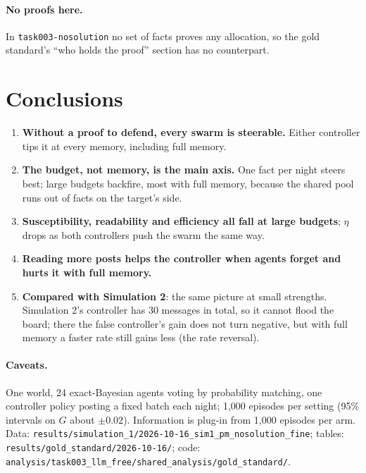 \documentclass[10pt,a4paper]{article}
\begin{document}
\paragraph{No proofs here.} In \texttt{task003-nosolution} no set of facts proves any allocation, so the
gold standard's ``who holds the proof'' section has no counterpart.

\section{Conclusions}

\begin{enumerate}\itemsep2pt
\item \textbf{Without a proof to defend, every swarm is steerable.} Either controller tips it at every memory,
  including full memory.
\item \textbf{The budget, not memory, is the main axis.} One fact per night steers best; large budgets backfire,
  most with full memory, because the shared pool runs out of facts on the target's side.
\item \textbf{Susceptibility, readability and efficiency all fall at large budgets}; $\eta$ drops as both controllers
  push the swarm the same way.
\item \textbf{Reading more posts helps the controller when agents forget and hurts it with full memory.}
\item \textbf{Compared with Simulation 2}: the same picture at small strengths. Simulation 2's controller has
  30 messages in total, so it cannot flood the board; there the false controller's gain does not turn negative, but
  with full memory a faster rate still gains less (the rate reversal).
\end{enumerate}

\paragraph{Caveats.} One world, 24 exact-Bayesian agents voting by probability matching, one controller policy
posting a fixed batch each night; 1{,}000 episodes per setting (95\% intervals on $G$ about $\pm0.02$). Information
is plug-in from 1{,}000 episodes per arm. Data: \texttt{results/simulation\_1/2026-10-16\_sim1\_pm\_nosolution\_fine};
tables: \texttt{results/gold\_standard/2026-10-16/}; code: \texttt{analysis/task003\_llm\_free/shared\_analysis/gold\_standard/}.
\end{document}
